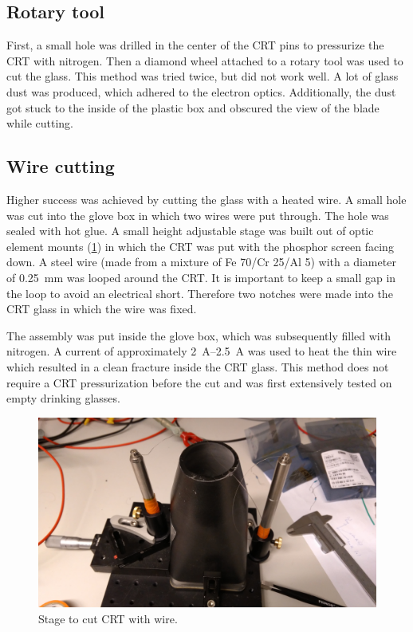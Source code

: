 \subsection{Rotary tool}
\label{subsec:Rotary tool}

First, a small hole was drilled in the center of the CRT pins to pressurize the CRT with nitrogen. Then a diamond wheel attached to a rotary tool was used to cut the glass. This method was tried twice, but did not work well. A lot of glass dust was produced, which adhered to the electron optics. Additionally, the dust got stuck to the inside of the plastic box and obscured the view of the blade while cutting.


\subsection{Wire cutting}
\label{subsec:Wire cutting}

Higher success was achieved by cutting the glass with a heated wire. A small hole was cut into the glove box in which two wires were put through. The hole was sealed with hot glue. A small height adjustable stage was built out of optic element mounts (\cref{fig:Stage to cut CRT with wire}) in which the CRT was put with the phosphor screen facing down. A steel wire (made from a mixture of Fe 70/Cr 25/Al 5) with a diameter of \SI{0.25}{\milli\meter} was looped around the CRT. It is important to keep a small gap in the loop to avoid an electrical short. Therefore two notches were made into the CRT glass in which the wire was fixed.

The assembly was put inside the glove box, which was subsequently filled with nitrogen. A current of approximately \SIrange{2}{2.5}{\ampere} was used to heat the thin wire which resulted in a clean fracture inside the CRT glass. This method does not require a CRT pressurization before the cut and was first extensively tested on empty drinking glasses.

\begin{figure}[ht]
	
	
	\includegraphics[width=.9\textwidth]{Chapters/CRT-handling/Cutting_Stage.jpg}
	\caption{Stage to cut CRT with wire.}
	\label{fig:Stage to cut CRT with wire}
\end{figure}



